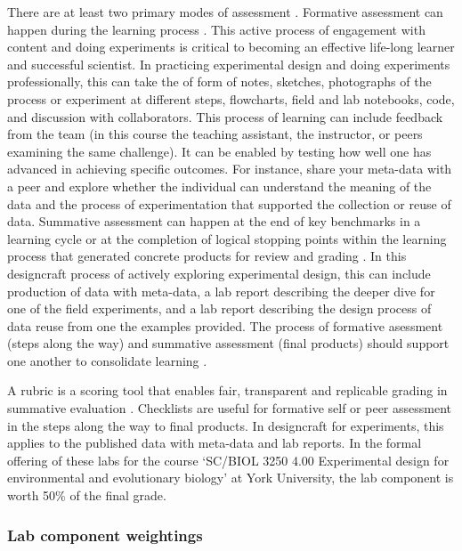 \documentclass[
]{book}
\begin{document}
There are at least two primary modes of assessment \citep{RN6795}. Formative assessment can happen during the learning process \citep{RN6796}. This active process of engagement with content and doing experiments is critical to becoming an effective life-long learner and successful scientist. In practicing experimental design and doing experiments professionally, this can take the of form of notes, sketches, photographs of the process or experiment at different steps, flowcharts, field and lab notebooks, code, and discussion with collaborators. This process of learning can include feedback from the team (in this course the teaching assistant, the instructor, or peers examining the same challenge). It can be enabled by testing how well one has advanced in achieving specific outcomes. For instance, share your meta-data with a peer and explore whether the individual can understand the meaning of the data and the process of experimentation that supported the collection or reuse of data. Summative assessment can happen at the end of key benchmarks in a learning cycle or at the completion of logical stopping points within the learning process that generated concrete products for review and grading \citep{RN6798}. In this designcraft process of actively exploring experimental design, this can include production of data with meta-data, a lab report describing the deeper dive for one of the field experiments, and a lab report describing the design process of data reuse from one the examples provided. The process of formative asessment (steps along the way) and summative assessment (final products) should support one another to consolidate learning \citep{RN6797}.

A rubric is a scoring tool that enables fair, transparent and replicable grading in summative evaluation \citep{RN6799}. Checklists are useful for formative self or peer assessment in the steps along the way to final products. In designcraft for experiments, this applies to the published data with meta-data and lab reports. In the formal offering of these labs for the course `SC/BIOL 3250 4.00 Experimental design for environmental and evolutionary biology' at York University, the lab component is worth 50\% of the final grade.

\hypertarget{lab-component-weightings}{%
\subsubsection*{Lab component weightings}\label{lab-component-weightings}}
\end{document}
